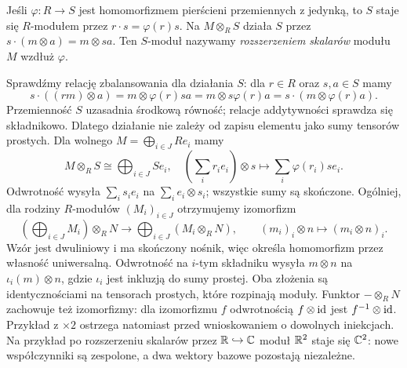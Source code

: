 \begin{definicja}
\label{def:rozszerzenie-skalarow}
Jeśli $\varphi:R\to S$ jest homomorfizmem
pierścieni przemiennych z jedynką, to $S$
staje się $R$-modułem przez $r\cdot s=\varphi(r)s$.
Na $M\otimes_R S$ działa $S$ przez
$s\cdot(m\otimes a)=m\otimes sa$.
Ten $S$-moduł nazywamy \emph{rozszerzeniem
skalarów} modułu $M$ wzdłuż $\varphi$.
\end{definicja}

Sprawdźmy relację zbalansowania dla działania
$S$: dla $r\in R$ oraz $s,a\in S$ mamy
\[
 s\cdot((rm)\otimes a)
 =m\otimes\varphi(r)sa
 =m\otimes s\varphi(r)a
 =s\cdot(m\otimes\varphi(r)a).
\]
Przemienność $S$ uzasadnia środkową równość;
relacje addytywności sprawdza się składnikowo.
Dlatego działanie nie zależy od zapisu elementu
jako sumy tensorów prostych. Dla wolnego
$M=\bigoplus_{i\in J}Re_i$ mamy
\[
 M\otimes_R S\cong\bigoplus_{i\in J}Se_i,
 \quad
 (\textstyle\sum_i r_i e_i)\otimes s
 \longmapsto\textstyle\sum_i\varphi(r_i)s e_i.
\]
Odwrotność wysyła $\sum_i s_i e_i$ na
$\sum_i e_i\otimes s_i$; wszystkie sumy są
skończone. Ogólniej, dla rodziny $R$-modułów $(M_i)_{i\in J}$
otrzymujemy izomorfizm
\[
 \left(\bigoplus_{i\in J}M_i\right)\otimes_R N
 \longrightarrow \bigoplus_{i\in J}(M_i\otimes_R N),
 \qquad (m_i)_i\otimes n\longmapsto(m_i\otimes n)_i.
\]
Wzór jest dwuliniowy i ma skończony nośnik, więc określa
homomorfizm przez własność uniwersalną. Odwrotność na
$i$-tym składniku wysyła $m\otimes n$ na $\iota_i(m)\otimes n$,
gdzie $\iota_i$ jest inkluzją do sumy prostej. Oba złożenia są
identycznościami na tensorach prostych, które rozpinają moduły.
Funktor $-\otimes_R N$ zachowuje też izomorfizmy: dla izomorfizmu $f$
odwrotnością $f\otimes\mathrm{id}$ jest $f^{-1}\otimes\mathrm{id}$.
Przykład z $\times2$ ostrzega natomiast przed
wnioskowaniem o dowolnych iniekcjach.
Na przykład po rozszerzeniu skalarów przez
$\mathbb{R}\hookrightarrow\mathbb{C}$ moduł $\mathbb{R}^2$ staje się
$\mathbb{C}^2$: nowe współczynniki są zespolone,
a dwa wektory bazowe pozostają niezależne.

